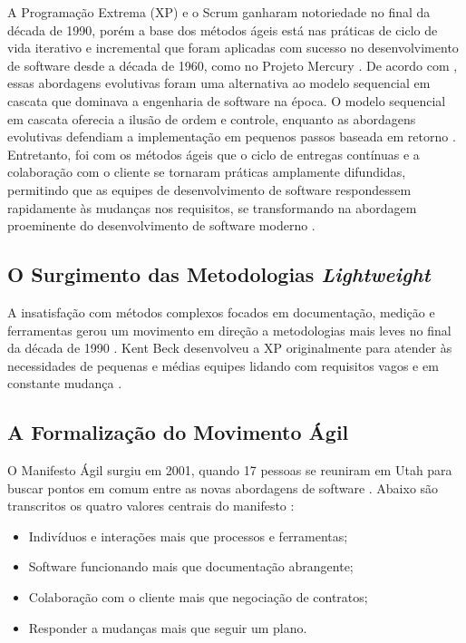 A Programação Extrema (XP) e o Scrum ganharam notoriedade no final da década de 1990, porém a base dos métodos ágeis está nas práticas de ciclo de vida iterativo e incremental que foram aplicadas com sucesso no desenvolvimento de software desde a década de 1960, como no Projeto Mercury \cite{Larman2003iid}. De acordo com , essas abordagens evolutivas foram uma alternativa ao modelo sequencial em cascata que dominava a engenharia de software na época. O modelo sequencial em cascata oferecia a ilusão de ordem e controle, enquanto as abordagens evolutivas defendiam a implementação em pequenos passos baseada em retorno \cite{Larman2003iid}.
Entretanto, foi com os métodos ágeis que o ciclo de entregas contínuas e a colaboração com o cliente se tornaram práticas amplamente difundidas, permitindo que as equipes de desenvolvimento de software respondessem rapidamente às mudanças nos requisitos, se transformando na abordagem proeminente do desenvolvimento de software moderno \cite{lopez-fernandez_2022}.

\subsection{O Surgimento das Metodologias \textit{Lightweight}}

A insatisfação com métodos complexos focados em documentação, medição e ferramentas gerou um movimento em direção a metodologias mais leves no final da década de 1990 \cite{Hoda2018re}. Kent Beck desenvolveu a XP originalmente para atender às necessidades de pequenas e médias equipes lidando com requisitos vagos e em constante mudança \cite{Beck2004}. 

\subsection{A Formalização do Movimento Ágil}

O Manifesto Ágil surgiu em 2001, quando 17 pessoas se reuniram em Utah para buscar pontos em comum entre as novas abordagens de software \cite{FowlerHighsmith2001}. Abaixo são transcritos os quatro valores centrais do manifesto \cite[não paginado, tradução nossa]{FowlerHighsmith2001}:

\begin{itemize}
    \item Indivíduos e interações mais que processos e ferramentas;
    \item Software funcionando mais que documentação abrangente;
    \item Colaboração com o cliente mais que negociação de contratos;
    \item Responder a mudanças mais que seguir um plano.
\end{itemize}



